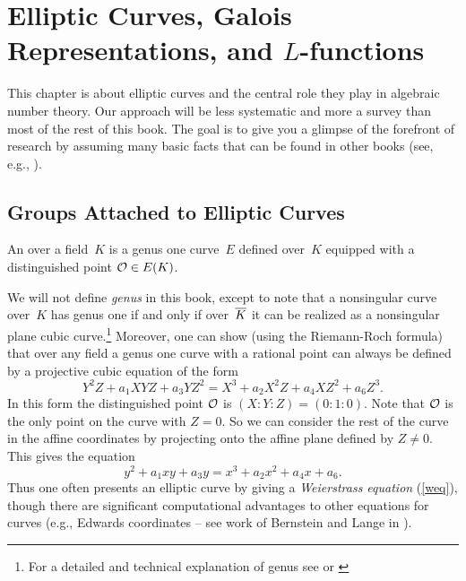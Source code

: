 \chapter[Elliptic Curves and $L$-functions]{Elliptic Curves, Galois Representations, and $L$-functions}

This chapter is about elliptic curves and the central role they play
in algebraic number theory.  Our approach will be less systematic and
more a survey than most of the rest of this book.  The goal is to
give you a glimpse of the forefront of research by assuming many basic
facts that can be found in other books (see, e.g.,
\cite{silverman:aec}).

\section{Groups Attached to Elliptic Curves}


\begin{definition}\label{defn:ec}
  An  over a field~$K$ is a genus one curve~$E$
  defined over~$K$ equipped with a distinguished point $\mathcal{O} \in E(K)$.
\end{definition}
We will not define \emph{genus} in this book, except to note that a
nonsingular curve over~$K$ has genus one if and only if over~$\overline{K}$
it can be realized as a nonsingular plane cubic curve.\footnote{
	For a detailed and technical explanation of genus
	see \cite[Ch II.8]{hartshorne} or
	\cite[Ch 7.3]{liu2006algebraic}
}
Moreover, one
can show (using the Riemann-Roch formula) that over any field a genus
one curve with a rational point can always be defined by a projective
cubic equation of the form
$$
  Y^2 Z + a_1 XYZ + a_3 YZ^2  = X^3  + a_2 X^2Z + a_4 XZ^2 + a_6 Z^3.
$$
In this form the distinguished point $\mathcal{O}$ is $(X:Y:Z) = (0:1:0)$.
Note that $\mathcal{O}$ is the only point on the curve with $Z=0$. So we
can consider the rest of the curve in the affine coordinates
by projecting onto the affine plane defined by $Z\neq 0$.
This gives the equation
\begin{equation}\label{weq}
  y^2 +a_1 xy + a_3 y = x^3 + a_2 x^2 + a_4 x + a_6.
\end{equation}
Thus one often presents an elliptic curve by giving a {\em Weierstrass
  equation} (\ref{weq}), though there are significant computational
advantages to other equations for curves (e.g., Edwards coordinates --
see work of Bernstein and Lange in \cite{bernstein2007inverted}).

